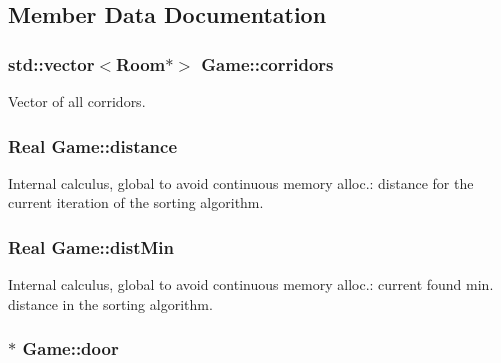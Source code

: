 \subsection{\-Member \-Data \-Documentation}
\hypertarget{classGame_ae3be567935e24e323adfd4d49d345f95}{
\subsubsection[{corridors}]{\setlength{\rightskip}{0pt plus 5cm}std\-::vector$<${\bf \-Room}$\ast$$>$ {\bf \-Game\-::corridors}}}\label{classGame_ae3be567935e24e323adfd4d49d345f95}
\-Vector of all corridors. \hypertarget{classGame_a77c996af0e47853d824e25a20faecb0d}{
\subsubsection[{distance}]{\setlength{\rightskip}{0pt plus 5cm}\-Real {\bf \-Game\-::distance}}}\label{classGame_a77c996af0e47853d824e25a20faecb0d}
\-Internal calculus, global to avoid continuous memory alloc.\-: distance for the current iteration of the sorting algorithm. \hypertarget{classGame_a2ad28722eec0aea922bb205220a80fe8}{
\subsubsection[{dist\-Min}]{\setlength{\rightskip}{0pt plus 5cm}\-Real {\bf \-Game\-::dist\-Min}}}\label{classGame_a2ad28722eec0aea922bb205220a80fe8}
\-Internal calculus, global to avoid continuous memory alloc.\-: current found min. distance in the sorting algorithm. \hypertarget{classGame_af92011162a240ad43f9171329e391942}{
\subsubsection[{door}]{$\ast$ {\bf \-Game\-::door}}}\label{classGame_af92011162a240ad43f9171329e391942}
